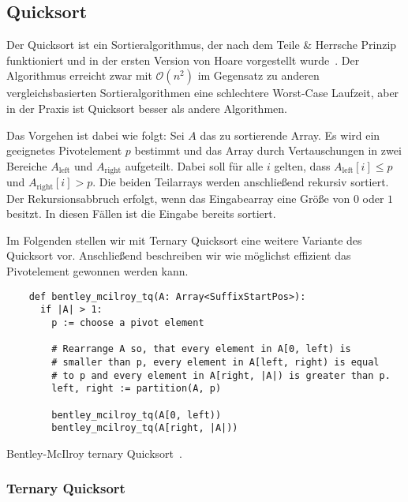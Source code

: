 \subsection{Quicksort}
\label{section:quicksort}

Der  Quicksort ist ein Sortieralgorithmus,
der nach dem Teile \& Herrsche Prinzip funktioniert und
in der ersten Version von Hoare vorgestellt wurde~\cite{quicksort}.
Der Algorithmus erreicht zwar mit $\mathcal O(n^2)$ im Gegensatz zu anderen
vergleichsbasierten Sortieralgorithmen eine schlechtere Worst-Case Laufzeit,
aber in der Praxis ist Quicksort besser als andere Algorithmen.

Das Vorgehen ist dabei wie folgt: Sei $A$ das zu sortierende Array.
Es wird ein geeignetes Pivotelement $p$ bestimmt und das Array durch Vertauschungen in
zwei Bereiche $A_{\text{left}}$ und $A_{\text{right}}$ aufgeteilt.
Dabei soll für alle $i$ gelten, dass $A_{\text{left}}[i] \le p$ und $A_{\text{right}}[i] > p$.
Die beiden Teilarrays werden anschließend rekursiv sortiert.
Der Rekursionsabbruch erfolgt, wenn das Eingabearray eine Größe von $0$ oder $1$ besitzt.
In diesen Fällen ist die Eingabe bereits sortiert.

Im Folgenden stellen wir mit Ternary Quicksort eine weitere Variante des Quicksort vor.
Anschließend beschreiben wir wie möglichst effizient das Pivotelement gewonnen werden kann.

\begin{listing}[!h]
    \begin{verbatim}
    def bentley_mcilroy_tq(A: Array<SuffixStartPos>):
      if |A| > 1:
        p := choose a pivot element
    
        # Rearrange A so, that every element in A[0, left) is
        # smaller than p, every element in A[left, right) is equal
        # to p and every element in A[right, |A|) is greater than p.
        left, right := partition(A, p)
    
        bentley_mcilroy_tq(A[0, left))
        bentley_mcilroy_tq(A[right, |A|))
    \end{verbatim}
    \caption{Bentley-McIlroy ternary Quicksort~\cite{ternary_quicksort}.}
\end{listing}    

\subsubsection{Ternary Quicksort}
\label{section:ternary_quicksort}

